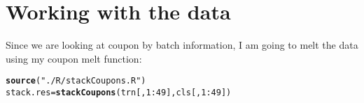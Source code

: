 \documentclass[10pt]{article}
\makeatletter
\newcommand{\hlnum}[1]{\textcolor[rgb]{0.686,0.059,0.569}{#1}}%
\newcommand{\hlstr}[1]{\textcolor[rgb]{0.192,0.494,0.8}{#1}}%
\newcommand{\hlopt}[1]{\textcolor[rgb]{0,0,0}{#1}}%
\newcommand{\hlstd}[1]{\textcolor[rgb]{0.345,0.345,0.345}{#1}}%
\newcommand{\hlkwb}[1]{\textcolor[rgb]{0.69,0.353,0.396}{#1}}%
\newcommand{\hlkwd}[1]{\textcolor[rgb]{0.737,0.353,0.396}{\textbf{#1}}}%
\newenvironment{kframe}{%
 \def\at@end@of@kframe{}%
 \ifinner\ifhmode%
  \def\at@end@of@kframe{\end{minipage}}%
  \begin{minipage}{\columnwidth}%
 \fi\fi%
 \def\FrameCommand##1{\hskip\@totalleftmargin \hskip-\fboxsep
 \colorbox{shadecolor}{##1}\hskip-\fboxsep
     \hskip-\linewidth \hskip-\@totalleftmargin \hskip\columnwidth}%
 \MakeFramed {\advance\hsize-\width
   \@totalleftmargin\z@ \linewidth\hsize
   \@setminipage}}%
 {\par\unskip\endMakeFramed%
 \at@end@of@kframe}
\newenvironment{knitrout}{}{} %
\makeatother
\begin{document}
\section{Working with the data}
Since we are looking at coupon by batch information, 
I am going to melt the data using my coupon melt function:
\begin{knitrout}
\color{fgcolor}\begin{kframe}
\begin{alltt}
   \hlkwd{source}\hlstd{(}\hlstr{"./R/stackCoupons.R"}\hlstd{)}
   \hlstd{stack.res} \hlkwb{=} \hlkwd{stackCoupons}\hlstd{(trn[,}\hlnum{1}\hlopt{:}\hlnum{49}\hlstd{],cls[,}\hlnum{1}\hlopt{:}\hlnum{49}\hlstd{])}
\end{alltt}



\end{kframe}
\end{knitrout}
\end{document}

